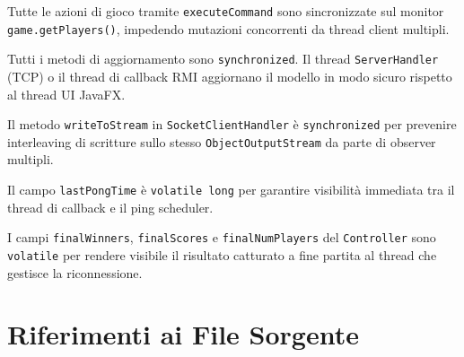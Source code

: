 \documentclass[a4paper,12pt]{article}
\newcommand{\code}[1]{\texttt{#1}}
\begin{document}
\begin{description}[leftmargin=2.2cm, labelwidth=2cm, itemsep=6pt]
  \item[\textbf{Controller}]
    Tutte le azioni di gioco tramite \code{executeCommand} sono sincronizzate
    sul monitor \code{game.getPlayers()}, impedendo mutazioni concorrenti da
    thread client multipli.

  \item[\textbf{ClientModel}]
    Tutti i metodi di aggiornamento sono \code{synchronized}. Il thread
    \code{ServerHandler} (TCP) o il thread di callback RMI aggiornano il
    modello in modo sicuro rispetto al thread UI JavaFX.

  \item[\textbf{Socket I/O}]
    Il metodo \code{writeToStream} in \code{SocketClientHandler} è
    \code{synchronized} per prevenire interleaving di scritture sullo stesso
    \code{ObjectOutputStream} da parte di observer multipli.

  \item[\textbf{Heartbeat}]
    Il campo \code{lastPongTime} è \code{volatile long} per garantire
    visibilità immediata tra il thread di callback e il ping scheduler.

  \item[\textbf{Stato finale}]
    I campi \code{finalWinners}, \code{finalScores} e \code{finalNumPlayers}
    del \code{Controller} sono \code{volatile} per rendere visibile il
    risultato catturato a fine partita al thread che gestisce la riconnessione.
\end{description}

\section{Riferimenti ai File Sorgente}
\end{document}
